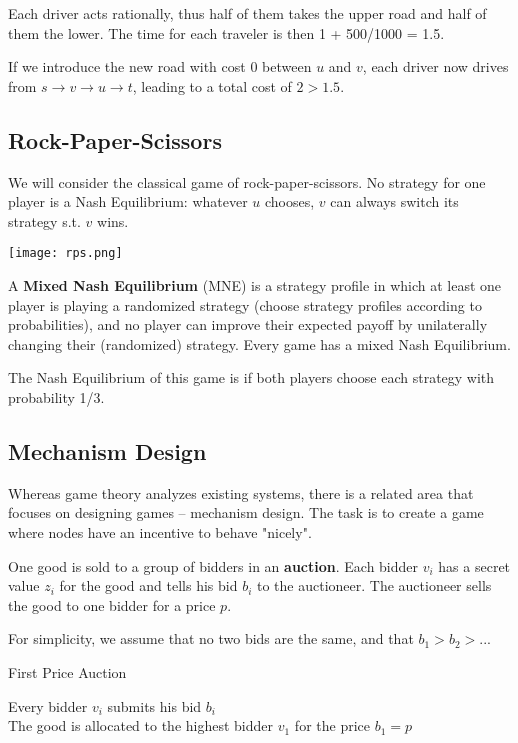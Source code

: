 Each driver acts rationally, thus half of them takes the upper road and half of them the lower. The time for each traveler is then 1 + 500/1000 = 1.5. \medskip

If we introduce the new road with cost 0 between $u$ and $v$, each driver now drives from $s \to v \to u \to t$, leading to a total cost of $2 > 1.5$.


\subsection{Rock-Paper-Scissors}

We will consider the classical game of rock-paper-scissors. No strategy for one player is a Nash Equilibrium: whatever $u$ chooses, $v$ can always switch its strategy s.t. $v$ wins.
\begin{center}
	\texttt{[image: rps.png]}
\end{center}

A \textbf{Mixed Nash Equilibrium} (MNE) is a strategy profile in which at least one player is playing a randomized strategy (choose strategy profiles according to probabilities), and no player can improve their expected payoff by unilaterally changing their (randomized) strategy. Every game has a mixed Nash Equilibrium.\medskip

The Nash Equilibrium of this game is if both players choose each strategy with probability 1/3.


\subsection{Mechanism Design}

Whereas game theory analyzes existing systems, there is a related area that focuses on designing games – mechanism design. The task is to create a game where nodes have an incentive to behave "nicely". \medskip

One good is sold to a group of bidders in an \textbf{auction}. Each bidder $v_i$ has a secret value $z_i$ for the good and tells his bid $b_i$ to the auctioneer. The auctioneer sells the good to one bidder for a price $p$. \medskip

For simplicity, we assume that no two bids are the same, and that $b_1 > b_2 > ...$\medskip

\begin{algorithm}[H]
\caption{First Price Auction}
	Every bidder $v_i$ submits his bid $b_i$\\
	The good is allocated to the highest bidder $v_1$ for the price $b_1 = p$
\end{algorithm}
\medskip

